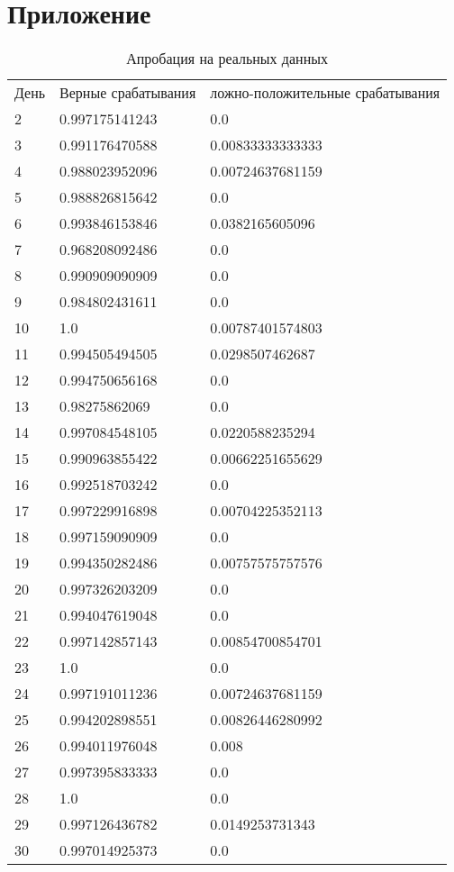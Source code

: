 \section{Приложение}
\begin{longtable}{|l|l|l|}
\caption[Апробация на реальных данных]{Апробация на реальных данных}  \label{REALDATATABLE} \\
День & Верные срабатывания & ложно-положительные срабатывания  \\  
2 & 0.997175141243 & 0.0 \\
3 & 0.991176470588 & 0.00833333333333 \\
4 & 0.988023952096 & 0.00724637681159 \\
5 & 0.988826815642 & 0.0 \\
6 & 0.993846153846 & 0.0382165605096 \\
7 & 0.968208092486 & 0.0 \\
8 & 0.990909090909 & 0.0 \\
9 & 0.984802431611 & 0.0 \\
10 & 1.0 & 0.00787401574803 \\
11 & 0.994505494505 & 0.0298507462687 \\
12 & 0.994750656168 & 0.0 \\
13 & 0.98275862069 & 0.0 \\
14 & 0.997084548105 & 0.0220588235294 \\
15 & 0.990963855422 & 0.00662251655629 \\
16 & 0.992518703242 & 0.0 \\
17 & 0.997229916898 & 0.00704225352113 \\
18 & 0.997159090909 & 0.0 \\
19 & 0.994350282486 & 0.00757575757576 \\
20 & 0.997326203209 & 0.0 \\
21 & 0.994047619048 & 0.0 \\
22 & 0.997142857143 & 0.00854700854701 \\
23 & 1.0 & 0.0 \\
24 & 0.997191011236 & 0.00724637681159 \\
25 & 0.994202898551 & 0.00826446280992 \\
26 & 0.994011976048 & 0.008 \\
27 & 0.997395833333 & 0.0 \\
28 & 1.0 & 0.0 \\
29 & 0.997126436782 & 0.0149253731343 \\
30 & 0.997014925373 & 0.0 \\
\end{longtable}
 
